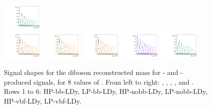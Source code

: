 \begin{figure}[htbp]
  \includegraphics[width=0.18\textwidth]{fig/2Dfit/templateSignalVsMX_fromDC_WprToWH_MVV_mu_HP_vbf_LDy.pdf}\\
  \includegraphics[width=0.18\textwidth]{fig/2Dfit/templateSignalVsMX_fromDC_GbuToWW_MVV_mu_LP_vbf_LDy.pdf}
  \includegraphics[width=0.18\textwidth]{fig/2Dfit/templateSignalVsMX_fromDC_RadToWW_MVV_mu_LP_vbf_LDy.pdf}
  \includegraphics[width=0.18\textwidth]{fig/2Dfit/templateSignalVsMX_fromDC_ZprToWW_MVV_mu_LP_vbf_LDy.pdf}
  \includegraphics[width=0.18\textwidth]{fig/2Dfit/templateSignalVsMX_fromDC_WprToWZ_MVV_mu_LP_vbf_LDy.pdf}
  \includegraphics[width=0.18\textwidth]{fig/2Dfit/templateSignalVsMX_fromDC_WprToWH_MVV_mu_LP_vbf_LDy.pdf}\\
  \caption{
    Signal shapes for the diboson reconstructed mass \MVV for \ggF- and \DY-produced signals, for 8 values of \MX.
    From left to right: \GBulktoWW, \RadtoWW, \ZprtoWW, \WprtoWZ, and \WprtoWH.
    Rows 1 to 6: HP-bb-LDy, LP-bb-LDy, HP-nobb-LDy, LP-nobb-LDy, HP-vbf-LDy, LP-vbf-LDy.
  }
  \label{fig:MVVShapes_NonVBF_LDy_Run2}
\end{figure}

